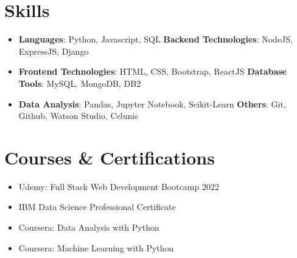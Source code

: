 \documentclass[letterpaper,11pt]{article}
\newcommand{\resumeItemSub}[1]{
  \item\small{
    {#1 \vspace{-2pt}}
  }
}
\newcommand{\resumeSubHeadingListStart}{\begin{itemize}[leftmargin=*]}
\newcommand{\resumeSubHeadingListEnd}{\end{itemize}}
\begin{document}
\section{Skills}
 \resumeSubHeadingListStart
    \item{
     \textbf{Languages}{: Python, Javascript, SQL}
     \hfill
     \textbf{Backend Technologies}{: NodeJS, ExpressJS, Django}
    }
    \item{
     \textbf{Frontend Technologies}{: HTML, CSS, Bootstrap, ReactJS}
     \hfill
     \textbf{Database Tools}{: MySQL, MongoDB, DB2}
    }
    \item{
     \textbf{Data Analysis}{: Pandas, Jupyter Notebook, Scikit-Learn}
     \hfill
     \textbf{Others}{: Git, Github, Watson Studio, Celunis}
    }
 \resumeSubHeadingListEnd
 
\section{Courses \& Certifications}
  \resumeSubHeadingListStart
    \resumeItemSub{Udemy: Full Stack Web Development Bootcamp 2022}
    \resumeItemSub{IBM Data Science Professional Certificate}
    \resumeItemSub{Coursera: Data Analysis with Python}
    \resumeItemSub{Coursera: Machine Learning with Python}
    
  \resumeSubHeadingListEnd
\end{document}
